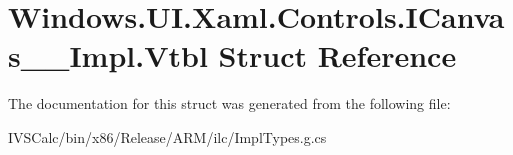 \hypertarget{struct_windows_1_1_u_i_1_1_xaml_1_1_controls_1_1_i_canvas_____impl_1_1_vtbl}{}\section{Windows.\+U\+I.\+Xaml.\+Controls.\+I\+Canvas\+\_\+\+\_\+\+Impl.\+Vtbl Struct Reference}
\label{struct_windows_1_1_u_i_1_1_xaml_1_1_controls_1_1_i_canvas_____impl_1_1_vtbl}


The documentation for this struct was generated from the following file\+:\begin{DoxyCompactItemize}
\item 
I\+V\+S\+Calc/bin/x86/\+Release/\+A\+R\+M/ilc/Impl\+Types.\+g.\+cs\end{DoxyCompactItemize}
